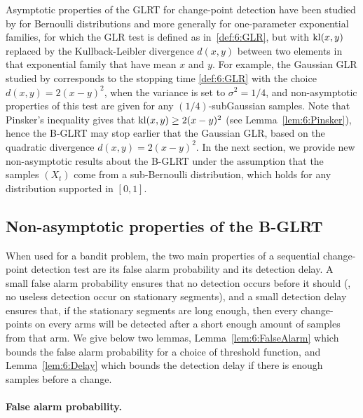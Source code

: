 Asymptotic properties of the GLRT for change-point detection have been studied by \cite{LaiXing10} for Bernoulli distributions and more generally for one-parameter exponential families, for which the GLR test is defined as in~\eqref{def:6:GLR}, but with $\mathrm{kl}(x,y)$ replaced by the Kullback-Leibler divergence $d(x,y)$ between two elements in that exponential family that have mean $x$ and $y$.
For example, the Gaussian GLR studied by \cite{Maillard2018GLR} corresponds to the stopping time \eqref{def:6:GLR} with the choice $d(x,y) = 2(x-y)^2$, when the variance is set to $\sigma^2=1/4$, and non-asymptotic properties of this test are given for any $(1/4)$-subGaussian samples.
Note that Pinsker's inequality gives that $\mathrm{kl}(x,y) \geq 2(x-y)^2$ (see Lemma~\ref{lem:6:Pinsker}), hence the B-GLRT may stop earlier that the Gaussian GLR, based on the quadratic divergence $d(x,y) = 2(x-y)^2$.
%
In the next section, we provide new non-asymptotic results about the B-GLRT under the assumption that the samples $(X_t)$ come from a sub-Bernoulli distribution, which holds for any distribution supported in $[0,1]$.


\subsection{Non-asymptotic properties of the B-GLRT}\label{subsec:6:PropGLR}

When used for a bandit problem, the two main properties of a sequential change-point detection test are its false alarm probability and its detection delay.
%
A small false alarm probability ensures that no detection occurs before it should (\ie, no useless detection occur on stationary segments), and a small detection delay ensures that, if the stationary segments are long enough, then every change-points on every arms will be detected after a short enough amount of samples from that arm.
%
We give below two lemmas, Lemma~\ref{lem:6:FalseAlarm} which bounds the false alarm probability for a choice of threshold function, and Lemma~\ref{lem:6:Delay} which bounds the detection delay if there is enough samples before a change.


\paragraph{False alarm probability.}\label{par:6:falseAlarm}


